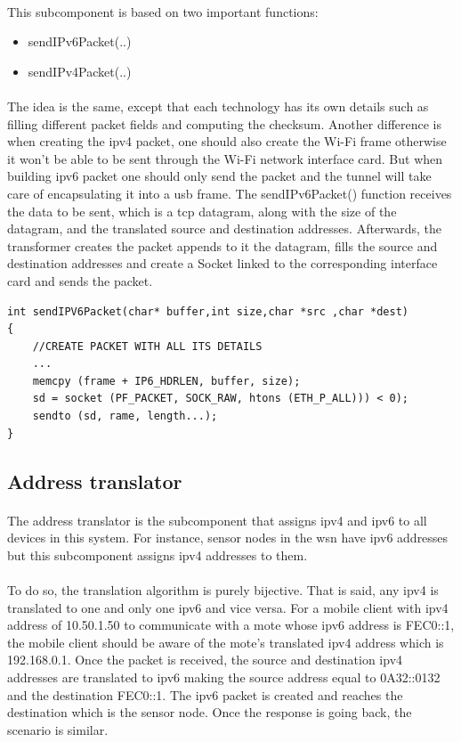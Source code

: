 \documentclass[oneside,12pt,a4paper,final]{book}
\begin{document}
\paragraph{}
This subcomponent is based on two important functions:
\begin{itemize}
\item sendIPv6Packet(..)
\item sendIPv4Packet(..)
\end{itemize}
\paragraph{}
The idea is the same, except that each technology has its own details such as filling different packet fields and computing the checksum. Another difference is when creating the \gls{ipv4} packet, one should also create the Wi-Fi frame otherwise it won't be able to be sent through the Wi-Fi network interface card. But when building \gls{ipv6} packet one should only send the packet and the tunnel will take care of encapsulating it into a \gls{usb} frame.
The sendIPv6Packet() function receives the data to be sent, which is a \gls{tcp} datagram, along with the size of the datagram, and the translated source and destination addresses. Afterwards, the transformer creates the packet appends to it the datagram, fills the source and destination addresses and create a Socket linked to the corresponding interface card and sends the packet.
\begin{lstlisting}
int sendIPV6Packet(char* buffer,int size,char *src ,char *dest)
{
	//CREATE PACKET WITH ALL ITS DETAILS
	...
	memcpy (frame + IP6_HDRLEN, buffer, size);
	sd = socket (PF_PACKET, SOCK_RAW, htons (ETH_P_ALL))) < 0);
	sendto (sd, rame, length...);
}
\end{lstlisting}

\subsection{Address translator}
\paragraph{}
The address translator is the subcomponent that assigns \gls{ipv4} and \gls{ipv6} to all devices in this system. For instance, sensor nodes in the \gls{wsn} have \gls{ipv6} addresses but this subcomponent assigns \gls{ipv4} addresses to them.
\paragraph{}
To do so, the translation algorithm is purely bijective. That is said, any \gls{ipv4} is translated to one and only one \gls{ipv6} and vice versa. For a mobile client with \gls{ipv4} address of 10.50.1.50 to communicate with a mote whose \gls{ipv6} address is FEC0::1, the mobile client should be aware of the mote's translated \gls{ipv4} address which is 192.168.0.1. Once the packet is received, the source and destination \gls{ipv4} addresses are translated to \gls{ipv6} making the source address equal to 0A32::0132 and the destination FEC0::1. The \gls{ipv6} packet is created and reaches the destination which is the sensor node. Once the response is going back, the scenario is similar.
\end{document}
